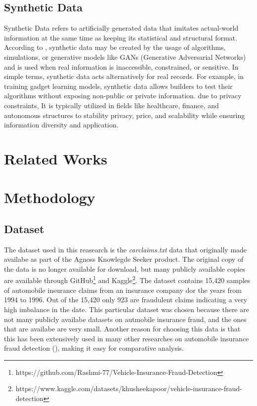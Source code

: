 \documentclass[twoside,11pt]{article}
\begin{document}
\subsection{Synthetic Data}
Synthetic Data refers to artificially generated data that imitates actual-world information at the same time as keeping its statistical and structural format. According to \cite{SyntheticPatki2016}, synthetic data may be created by the usage of algorithms, simulations, or generative models like GANs (Generative Adversarial Networks) and is used when real information is inaccessible, constrained, or sensitive.
In simple terms, synthetic data acts alternatively for real records. For example, in training gadget learning models, synthetic data allows builders to test their algorithms without exposing non-public or private information. due to privacy constraints, It is typically utilized in fields like healthcare, finance, and autonomous structures to stability privacy, price, and scalability while ensuring information diversity and application.

\section{Related Works}


\section{Methodology}
\subsection{Dataset}
The dataset used in this reasearch is the \emph{carclaims.txt} data that originally made availabe as part of the Agnoss Knowlegde Seeker product. The original copy of the data is no longer available for download, but many publicly available copies are available through GitHub\footnote{https://github.com/Rashmi-77/Vehicle-Insurance-Fraud-Detection} and Kaggle\footnote{https://www.kaggle.com/datasets/khusheekapoor/vehicle-insurance-fraud-detection}. The dataset contains 15,420 samples of automobile insurance claims from an insurance company dor the years from 1994 to 1996. Out of the 15,420 only 923 are fraudulent claims indicating a very high imbalance in the date. This particular dataset was chosen because there are not many publicly availabe datasets on autmobile insurance fraud, and the ones that are availabe are very small. Another reason for choosing this data is that this has been extensively used in many other researches on automobile insurance fraud detection (\citealp{}), making it easy for comparative analysis.
\end{document}
